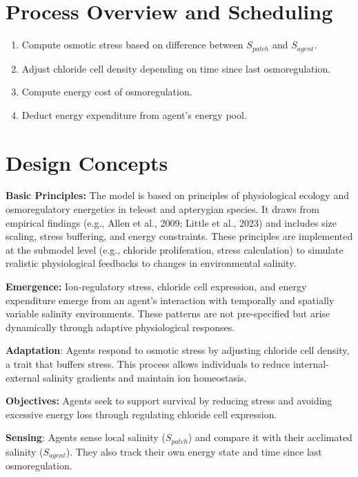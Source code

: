 \documentclass[
]{book}
\begin{document}
\section{Process Overview and Scheduling}\label{process-overview-and-scheduling}

\begin{enumerate}
\def\labelenumi{\arabic{enumi}.}
\item
  Compute osmotic stress based on difference between \(S_{patch}\) and \(S_{agent}\).
\item
  Adjust chloride cell density depending on time since last osmoregulation.
\item
  Compute energy cost of osmoregulation.
\item
  Deduct energy expenditure from agent's energy pool.
\end{enumerate}

\section{Design Concepts}\label{design-concepts}

\textbf{Basic Principles:} The model is based on principles of physiological ecology and osmoregulatory energetics in teleost and apterygian species. It draws from empirical findings (e.g., Allen et al., 2009; Little et al., 2023) and includes size scaling, stress buffering, and energy constraints. These principles are implemented at the submodel level (e.g., chloride proliferation, stress calculation) to simulate realistic physiological feedbacks to changes in environmental salinity.

\textbf{Emergence:} Ion-regulatory stress, chloride cell expression, and energy expenditure emerge from an agent's interaction with temporally and spatially variable salinity environments. These patterns are not pre-specified but arise dynamically through adaptive physiological responses.

\textbf{Adaptation}: Agents respond to osmotic stress by adjusting chloride cell density, a trait that buffers stress. This process allows individuals to reduce internal-external salinity gradients and maintain ion homeostasis.

\textbf{Objectives:} Agents seek to support survival by reducing stress and avoiding excessive energy loss through regulating chloride cell expression.

\textbf{Sensing}: Agents sense local salinity (\(S_{patch}\)) and compare it with their acclimated salinity (\(S_{agent}\)). They also track their own energy state and time since last osmoregulation.
\end{document}

